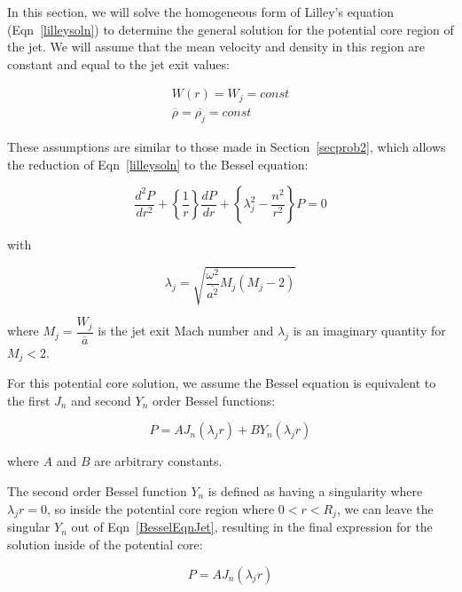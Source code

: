 \documentclass[]{aiaa-tc}%
\begin{document}
In this section, we will solve the homogeneous form of Lilley's equation (Eqn~\ref{lilleysoln}) to determine the general solution for the potential core region of the jet.  We will assume that the mean velocity and density in this region are constant and equal to the jet exit values:

\begin{align}
W(r)=W_j=const \\
\overline{\rho} = \overline{\rho_j} = const
\end{align}

These assumptions are similar to those made in Section~\ref{secprob2}, which allows the reduction of Eqn~\ref{lilleysoln} to the Bessel equation:

\begin{equation} \label{BesselEqnJet}
\boxed{ \dfrac{d^2P}{dr^2} + \left\{ \dfrac{1}{r} \right\} \dfrac{dP}{dr}
      + \left\{ \lambda_{j}^2 - \dfrac{n^2}{r^2} \right\} P = 0 }
\end{equation}

\noindent with

\begin{equation} \label{lambdaJ}
\lambda_{j} = \sqrt{ \dfrac{\omega^2}{\overline{a^2}} M_{j} ( M_{j} - 2 ) }
\end{equation}

\noindent where $M_{j}=\dfrac{W_j}{\overline{a}}$ is the jet exit Mach number and $\lambda_{j}$ is an imaginary quantity for $M_{j} < 2$.

For this potential core solution, we assume the Bessel equation is equivalent to the first $J_n$ and second $Y_n$ order Bessel functions:

\begin{equation}
P = A J_n(\lambda_j r) + B Y_n(\lambda_j r)
\end{equation}

\noindent where $A$ and $B$ are arbitrary constants.

The second order Bessel function $Y_n$ is defined as having a singularity where $\lambda_j r = 0$, so inside the potential core region where $0<r<R_j$, we can leave the singular $Y_n$ out of Eqn~\ref{BesselEqnJet}, resulting in the final expression for the solution inside of the potential core:

\begin{equation} \label{BesselCore}
\boxed{P = A J_n(\lambda_j r)}
\end{equation}


\end{document}
